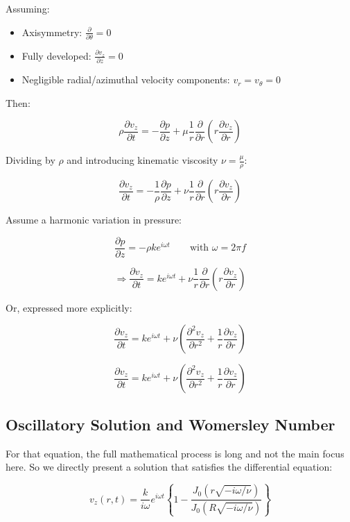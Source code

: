 \documentclass[a4paper,12pt]{article}
\begin{document}
\medskip

Assuming:
\begin{itemize}
    \item Axisymmetry: \( \frac{\partial}{\partial \theta} = 0 \)
    \item Fully developed: \( \frac{\partial v_z}{\partial z} = 0 \)
    \item Negligible radial/azimuthal velocity components: \( v_r = v_\theta = 0 \)
\end{itemize}

Then:

\[
\rho \frac{\partial v_z}{\partial t} = -\frac{\partial p}{\partial z} + \mu \frac{1}{r} \frac{\partial}{\partial r} \left( r \frac{\partial v_z}{\partial r} \right)
\]

Dividing by \( \rho \) and introducing kinematic viscosity \( \nu = \frac{\mu}{\rho} \):

\[
\frac{\partial v_z}{\partial t} = -\frac{1}{\rho} \frac{\partial p}{\partial z} + \nu \frac{1}{r} \frac{\partial}{\partial r} \left( r \frac{\partial v_z}{\partial r} \right)
\]

\medskip

Assume a harmonic variation in pressure:

\[
\frac{\partial p}{\partial z} = -\rho k e^{i \omega t} \qquad \text{with } \omega = 2\pi f
\]

\[
\Rightarrow \frac{\partial v_z}{\partial t} = k e^{i \omega t} + \nu \frac{1}{r} \frac{\partial}{\partial r} \left( r \frac{\partial v_z}{\partial r} \right)
\]

Or, expressed more explicitly:

\[
\frac{\partial v_z}{\partial t} = k e^{i \omega t} + \nu \left( \frac{\partial^2 v_z}{\partial r^2} + \frac{1}{r} \frac{\partial v_z}{\partial r} \right)
\]

\[
\boxed{
\frac{\partial v_z}{\partial t} = k e^{i \omega t} + \nu \left( \frac{\partial^2 v_z}{\partial r^2} + \frac{1}{r} \frac{\partial v_z}{\partial r} \right)
}
\]


\subsection*{Oscillatory Solution and Womersley Number}

For that equation, the full mathematical process is long and not the main focus here. So we directly present a solution that satisfies the differential equation:

\[
v_z(r,t) = \frac{k}{i\omega} e^{i\omega t} \left\{ 1 - \frac{J_0 \left( r \sqrt{-i \omega / \nu} \right)}{J_0 \left( R \sqrt{-i \omega / \nu} \right)} \right\}
\]
\end{document}
